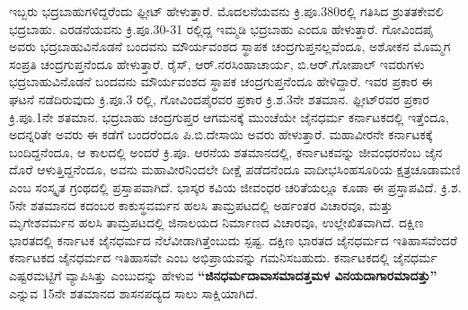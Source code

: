 ಇಬ್ಬರು ಭದ್ರಬಾಹುಗಳಿದ್ದರೆಂದು ಫ್ಲೀಟ್​ ಹೇಳುತ್ತಾರೆ. ಮೊದಲನೆಯವನು ಕ್ರಿ.ಪೂ.380ರಲ್ಲಿ ಗತಿಸಿದ ಶ್ರುತತಕೇವಲಿ ಭದ್ರಬಾಹು. ಎರಡನೆಯವನು ಕ್ರಿ.ಪೂ.30-31 ರಲ್ಲಿದ್ದ ಇಮ್ಮಡಿ ಭದ್ರಬಾಹು ಎಂದೂ ಹೇಳುತ್ತಾರೆ. ಗೋವಿಂದಪೈ ಅವರು ಭದ್ರಬಾಹುವಿನೊಡನೆ ಬಂದವನು ಮೌರ್ಯವಂಶದ ಸ್ಥಾಪಕ ಚಂದ್ರಗುಪ್ತನಲ್ಲವೆಂದೂ, ಅಶೋಕನ ಮೊಮ್ಮಗ ಸಂಪ್ರತಿ ಚಂದ್ರಗುಪ್ತನೆಂದೂ ಹೇಳುತ್ತಾರೆ. ರೈಸ್​, ಆರ್​.ನರಸಿಂಹಾಚಾರ್ಯ, ಬಿ.ಆರ್​.ಗೋಪಾಲ್​ ಇವರುಗಳು ಭದ್ರಬಾಹುವಿನೊಡನೆ ಬಂದವನು ಮೌರ್ಯವಂಶದ ಸ್ಥಾಪಕ ಚಂದ್ರಗುಪ್ತನೆಂದೂ ಹೇಳಿದ್ದಾರೆ. ಇವರ ಪ್ರಕಾರ ಈ ಘಟನೆ ನಡೆದಿರುವುದು ಕ್ರಿ.ಪೂ.3 ರಲ್ಲಿ, ಗೋವಿಂದಪೈರವರ ಪ್ರಕಾರ ಕ್ರಿ.ಶ.3ನೇ ಶತಮಾನ. ಫ್ಲೀಟ್​ರವರ ಪ್ರಕಾರ ಕ್ರಿ.ಪೂ.1ನೇ ಶತಮಾನ. ಭದ್ರಬಾಹು ಚಂದ್ರಗುಪ್ತರ ಆಗಮನಕ್ಕೆ ಮುಂಚೆಯೇ ಜೈನಧರ್ಮ ಕರ್ನಾಟಕದಲ್ಲಿ ಇತ್ತೆಂದೂ, ಅದನ್ನರಿತೇ ಅವರು ಈ ಕಡೆಗೆ ಬಂದರೆಂದೂ ಪಿ.ಬಿ.ದೇಸಾಯಿ ಅವರು ಹೇಳುತ್ತಾರೆ. ಮಹಾವೀರನೇ ಕರ್ನಾಟಕಕ್ಕೆ ಬಂದಿದ್ದನೆಂದೂ, ಆ ಕಾಲದಲ್ಲಿ ಅಂದರೆ ಕ್ರಿ.ಪೂ. ಆರನೆಯ ಶತಮಾನದಲ್ಲಿ, ಕರ್ನಾಟಕವನ್ನು ಜೀವಂಧರನೆಂಬ ಜೈನ ದೊರೆ ಆಳುತ್ತಿದ್ದನೆಂದೂ, ಅವನು ಮಹಾವೀರನಿಂದಲೇ ದೀಕ್ಷೆ ಪಡೆದನೆಂದೂ ವಾದೀಭಸಿಂಹಸೂರಿಯ ಕ್ಷತ್ರಚೂಡಾಮಣಿ ಎಂಬ ಸಂಸ್ಕೃತ ಗ್ರಂಥದಲ್ಲಿ ಪ್ರಸ್ತಾಪವಾಗಿದೆ. ಭಾಸ್ಕರ ಕವಿಯ ಜೀವಂಧರ ಚರಿತೆಯಲ್ಲೂ ಕೂಡಾ ಈ ಪ್ರಸ್ತಾಪವಿದೆ. ಕ್ರಿ.ಶ. 5ನೇ ಶತಮಾನದ ಕದಂಬರ ಕಾಕುಸ್ಥವರ್ಮನ ಹಲಸಿ ತಾಮ್ರಪಟದಲ್ಲಿ ಅರ್ಹಂತರ ವಿಚಾರವೂ,  ಮತ್ತು ಮೃಗೇಶವರ್ಮನ ಹಲಸಿ ತಾಮ್ರಪಟದಲ್ಲಿ ಜಿನಾಲಯದ ನಿರ್ಮಾಣದ ವಿಚಾರವೂ,  ಉಲ್ಲೇಖಿತವಾಗಿದೆ. ದಕ್ಷಿಣ ಭಾರತದಲ್ಲಿ ಕರ್ನಾಟಕ ಜೈನಧರ್ಮದ ನೆಲೆವೀಡಾಗಿತ್ತೆಂಬುದು ಸ್ಪಷ್ಟ. ದಕ್ಷಿಣ ಭಾರತದ ಜೈನಧರ್ಮದ ಇತಿಹಾಸವೆಂದರೆ ಕರ್ನಾಟಕದ ಜೈನಧರ್ಮದ ಇತಿಹಾಸವೇ ಎಂಬ ಅಭಿಪ್ರಾಯವನ್ನು ಗಮನಿಸಬಹುದು. ಕರ್ನಾಟಕದಲ್ಲಿ ಜೈನಧರ್ಮ ಎಷ್ಟರಮಟ್ಟಿಗೆ ವ್ಯಾಪಿಸಿತ್ತು ಎಂಬುದನ್ನು ಹೇಳುವ \textbf{“ಜಿನಧರ್ಮದಾವಾಸಮಾದತ್ತಮಳ ವಿನಯದಾಗಾರಮಾದತ್ತು”} ಎನ್ನುವ 15ನೇ ಶತಮಾನದ ಶಾಸನಪದ್ಯದ ಸಾಲು ಸಾಕ್ಷಿಯಾಗಿದೆ.

